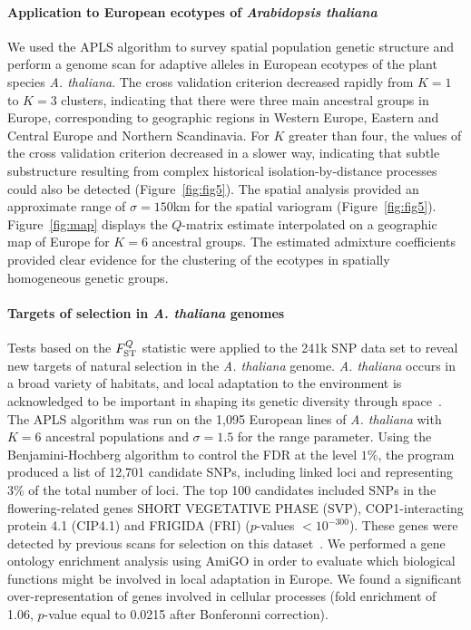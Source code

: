 \paragraph{Application to European ecotypes of {\it Arabidopsis thaliana}} We
used the APLS algorithm to survey spatial population genetic structure and
perform a genome scan for adaptive alleles in European ecotypes of the plant
species {\it A. thaliana}. The cross validation criterion decreased rapidly from
$K=1$ to $K=3$ clusters, indicating that there were three main ancestral groups
in Europe, corresponding to geographic regions in Western Europe, Eastern and
Central Europe and Northern Scandinavia. For $K$ greater than four, the values
of the cross validation criterion decreased in a slower way, indicating that
subtle substructure resulting from complex historical isolation-by-distance
processes could also be detected (Figure~\ref{fig:fig5}). The spatial analysis provided an
approximate range of $\sigma = 150$km for the spatial variogram (Figure~\ref{fig:fig5}).
Figure~\ref{fig:map} displays the $Q$-matrix estimate interpolated on a geographic map of
Europe for $K = 6$ ancestral groups. The estimated admixture coefficients
provided clear evidence for the clustering of the ecotypes in spatially
homogeneous genetic groups.

\paragraph{Targets of selection in {\it A. thaliana} genomes} Tests based on the
$F^Q_{\rm ST}$ statistic were applied to the 241k SNP data set to reveal new
targets of natural selection in the {\it A. thaliana} genome. {\it A. thaliana}
occurs in a broad variety of habitats, and local adaptation to the environment
is acknowledged to be important in shaping its genetic diversity through
space~\citep{Hancock2011, Fournier-Level2011}. The APLS algorithm was run on the
1,095 European lines of {\it A. thaliana} with $K=6$ ancestral populations and
$\sigma = 1.5$ for the range parameter. Using the Benjamini-Hochberg algorithm to
control the FDR at the level $1\%$, the program produced a list of 12,701
candidate SNPs, including linked loci and representing 3\% of the total number
of loci. The top 100 candidates included SNPs in the flowering-related genes
SHORT VEGETATIVE PHASE (SVP), COP1-interacting protein 4.1 (CIP4.1) and FRIGIDA
(FRI) ($p$-values $< 10^{-300}$). These genes were detected by previous scans
for selection on this dataset~\citep{Horton2012}. We performed a gene ontology
enrichment analysis using AmiGO in order to evaluate which biological functions
might be involved in local adaptation in Europe. We found a significant
over-representation of genes involved in cellular processes (fold enrichment of
1.06, $p$-value equal to 0.0215 after Bonferonni correction).



